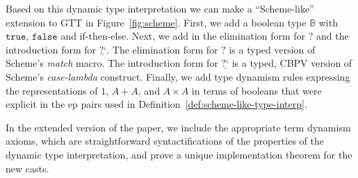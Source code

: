 \documentclass[acmsmall,screen,12pt]{acmart}
\renewcommand{\u}{\underline}
\newcommand{\tru}{\texttt{true}}
\newcommand{\fls}{\texttt{false}}
\newcommand{\bool}{\mathbb{B}}
\newcommand{\dynv}{{?}}
\newcommand{\dync}{\u {\text{?`}}}
\begin{document}
Based on this dynamic type interpretation we can make a ``Scheme-like''
extension to GTT in Figure~\ref{fig:scheme}.
%
First, we add a boolean type $\bool$ with $\tru$, $\fls$ and
if-then-else.
%
Next, we add in the elimination form for $\dynv$ and the introduction
form for $\dync$.
%
The elimination form for $\dynv$ is a typed version of Scheme's
\emph{match} macro.
%
The introduction form for $\dync$ is a typed, CBPV version of Scheme's
\emph{case-lambda} construct.
%
Finally, we add type dynamism rules expressing the representations of
$1$, $A + A$, and $A \times A$ in terms of booleans that were explicit
in the ep pairs used in Definition~\ref{def:scheme-like-type-interp}.
\begin{shortonly}
  In the extended version of the paper, we include the appropriate term
  dynamism axioms, which are straightforward syntactifications of the
  properties of the dynamic type interpretation, and prove a unique
  implementation theorem for the new casts.
\end{shortonly}
\end{document}
